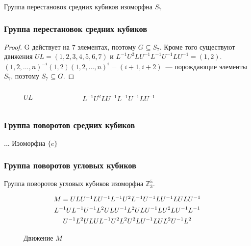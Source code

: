 \documentclass{beamer}
\begin{document}
\begin{frame}
\begin{theorem}
	Группа перестановок средних кубиков изоморфна $S_7$
\end{theorem}
\frametitle{Группа перестановок средних кубиков}
\begin{proof}
G действует на 7 элементах, поэтому $G\subseteq S_7$. Кроме того существуют движения $UL=(1,2,3,4,5,6,7)$ и $L^{-1}U^2LU^{-1}L^{-1}U^{-1}LU^{-1}=(1,2)$.
$(1,2,\ldots,n)^{-i}(1,2)(1,2,\ldots,n)^i=(i+1,i+2)$~--- порождающие элементы $S_7$, поэтому $S_7\subseteq G$.
\end{proof}
\vspace*{-5mm}
\begin{columns}[c]
\begin{figure}
\RubikCubeSolved
{}
\caption{$UL$}
\end{figure}
\begin{figure}
\RubikCubeSolved
{}
\caption{$L^{-1}U^2LU^{-1}L^{-1}U^{-1}LU^{-1}$}
\end{figure}
\end{columns}
\end{frame}


\begin{frame}
\frametitle{Группа поворотов средних кубиков}
...
Изоморфна $\{e\}$
\end{frame}


\begin{frame}
\frametitle{Группа поворотов угловых кубиков}
\begin{theorem}
Группа поворотов угловых кубиков изоморфна $\mathbb{Z}_3^5$.
\end{theorem}
\begin{multline*}
$$
M = ULU^{-1}LU^{-1}L^{-1}U^2L^{-1}U^{-1}LU^{-1}LULU^{-1}       \\
L^{-1}UL^{-1}U^{-1}L^2ULU^{-1}L^2ULU^{-1}LU^2LU^{-1}L^{-1} \\
U^{-1}L^2ULUL^{-1}U^2L^2U^2LU^{-1}LUL^2U^{-1}L^2
$$
\end{multline*}
\begin{figure}
	\RubikCubeSolved
	\caption{Движение $M$}
\end{figure}
\end{frame}
\end{document}
